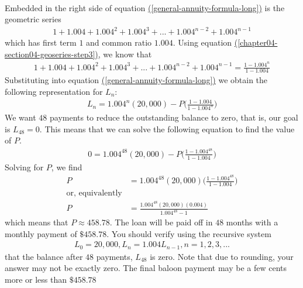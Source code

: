 \documentclass[10pt,]{book}
\theoremstyle{ptxdefinitionnotitle}
\theoremstyle{ptxdefinitiontitle}
\theoremstyle{ptxdefinitionnotitle}
\theoremstyle{ptxdefinitiontitle}
\theoremstyle{ptxdefinitionnotitle}
\theoremstyle{ptxdefinitiontitle}
\numberwithin{equation}{section}
\begin{document}
\begin{example}
\begin{gather}
\end{gather}
\hypertarget{p-163}{}%
Embedded in the right side of equation \hyperref[general-annuity-formula-long]{(\ref{general-annuity-formula-long})} is the geometric series%
%
\begin{gather*}
1 + 1.004 + 1.004^2 + 1.004^3 + ... + 1.004^{n-2} + 1.004^{n-1}
\end{gather*}
\hypertarget{p-164}{}%
which has first term \(1\) and common ratio \(1.004\). Using equation \hyperref[chapter04-section04-geoseries-step3]{(\ref{chapter04-section04-geoseries-step3})}, we know that%
%
\begin{gather*}
1 + 1.004 + 1.004^2 + 1.004^3 + ... + 1.004^{n-2} + 1.004^{n-1} = \frac{1-1.004^n}{1-1.004}
\end{gather*}
\hypertarget{p-165}{}%
Substituting into equation \hyperref[general-annuity-formula-long]{(\ref{general-annuity-formula-long})} we obtain the following representation for  \(L_n\):%
%
\begin{gather}
L_n = 1.004^n (20,000) - P\bigg(\frac{1-1.004}{1-1.004^n}\bigg)\label{general-annuity-formula-condensed}
\end{gather}
\hypertarget{p-166}{}%
We want \(48\) payments to reduce the outstanding balance to zero, that is, our goal is  \(L_{48}=0\). This means that we can solve the following equation to find the value of \(P\).%
%
\begin{gather*}
0 = 1.004^{48}(20,000)-P\bigg(\frac{1-1.004^{48}}{1-1.004}\bigg)
\end{gather*}
\hypertarget{p-167}{}%
Solving for \(P\), we find%
%
\begin{align*}
P &= 1.004^{48}(20,000)\bigg(\frac{1-1.004^{48}}{1-1.004}\bigg)\\
\text{or, equivalently}\\
P&=\frac{1.004^{48}(20,000)(0.004)}{1.004^{48}-1}
\end{align*}
\hypertarget{p-168}{}%
which means that \(P \approx 458.78\). The loan will be paid off in \(48\) months with a monthly payment of \(\$458.78\). You should verify using the recursive system%
%
\begin{gather*}
L_0 = 20,000, L_n = 1.004L_{n-1}, n = 1, 2, 3, ...
\end{gather*}
\hypertarget{p-169}{}%
that the balance after \(48\) payments, \(L_{48}\) is zero. Note that due to rounding, your answer may not be exactly zero. The final baloon payment may be a few cents more or less than \(\$458.78\)%
\par
\hypertarget{p-170}{}%

\end{example}
\end{document}
